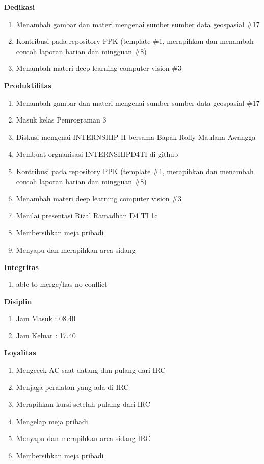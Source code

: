 \begin{enumerate}
\textbf{Dedikasi}
\begin{enumerate}
\item Menambah gambar dan materi mengenai sumber sumber data geospasial \#17
\item Kontribusi pada repository PPK (template \#1, merapihkan dan menambah contoh laporan harian dan mingguan \#8)
\item Menambah materi deep learning computer vision \#3
\end{enumerate}

\textbf{Produktifitas}
\begin{enumerate}
\item Menambah gambar dan materi mengenai sumber sumber data geospasial \#17
\item Masuk kelas Pemrograman 3 
\item Diskusi mengenai INTERNSHIP II bersama Bapak Rolly Maulana Awangga
\item Membuat orgnanisasi INTERNSHIPD4TI di github
\item Kontribusi pada repository PPK (template \#1, merapihkan dan menambah contoh laporan harian dan mingguan \#8)
\item Menambah materi deep learning computer vision \#3
\item Menilai presentasi Rizal Ramadhan D4 TI 1c 
\item Membersihkan meja pribadi
\item Menyapu dan merapihkan area sidang 
\end{enumerate}

\textbf{Integritas}
\begin{enumerate}
\item able to merge/has no conflict
\end{enumerate}


\textbf{Disiplin}
\begin{enumerate}
\item Jam Masuk : 08.40
\item Jam Keluar : 17.40
\end{enumerate}


\textbf{Loyalitas}
\begin{enumerate}
\item Mengecek AC saat datang dan pulang dari IRC
\item Menjaga peralatan yang ada di IRC
\item Merapihkan kursi setelah pulamg dari IRC
\item Mengelap meja pribadi
\item Menyapu dan merapihkan area sidang IRC
\item Membersihkan meja pribadi
\end{enumerate}


\end{enumerate}
